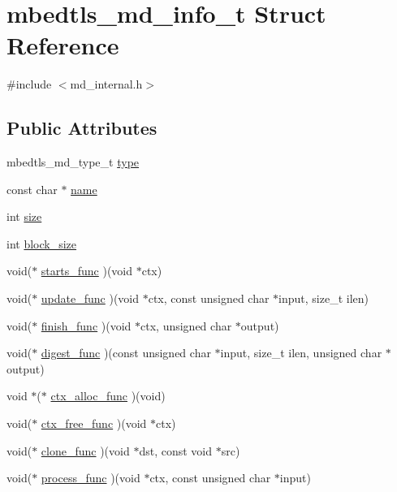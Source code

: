 \hypertarget{structmbedtls__md__info__t}{\section{mbedtls\-\_\-md\-\_\-info\-\_\-t Struct Reference}
\label{structmbedtls__md__info__t}
}


{\ttfamily \#include $<$md\-\_\-internal.\-h$>$}

\subsection*{Public Attributes}
\begin{DoxyCompactItemize}
\item 
mbedtls\-\_\-md\-\_\-type\-\_\-t \hyperlink{structmbedtls__md__info__t_ae27d588a1b1a7c4f96384fc5705f5c3d}{type}
\item 
const char $\ast$ \hyperlink{structmbedtls__md__info__t_a91340331832845c885d99884426d21c6}{name}
\item 
int \hyperlink{structmbedtls__md__info__t_a17a6641cfc5d4e7542d450463c4122f6}{size}
\item 
int \hyperlink{structmbedtls__md__info__t_a2090181c3aef5c7d692147340a6bdf99}{block\-\_\-size}
\item 
void($\ast$ \hyperlink{structmbedtls__md__info__t_a69899182d91a8dbc034bfcf8b87517e6}{starts\-\_\-func} )(void $\ast$ctx)
\item 
void($\ast$ \hyperlink{structmbedtls__md__info__t_a7bb49e033b3b8a1def01f393f40bbef1}{update\-\_\-func} )(void $\ast$ctx, const unsigned char $\ast$input, size\-\_\-t ilen)
\item 
void($\ast$ \hyperlink{structmbedtls__md__info__t_aa4318bc22c60d0e37dc976ac9ad2f704}{finish\-\_\-func} )(void $\ast$ctx, unsigned char $\ast$output)
\item 
void($\ast$ \hyperlink{structmbedtls__md__info__t_a1f6293aafcd824caef39ed3daf75f0b4}{digest\-\_\-func} )(const unsigned char $\ast$input, size\-\_\-t ilen, unsigned char $\ast$output)
\item 
void $\ast$($\ast$ \hyperlink{structmbedtls__md__info__t_a751f793f0b843972d8a979544785bb61}{ctx\-\_\-alloc\-\_\-func} )(void)
\item 
void($\ast$ \hyperlink{structmbedtls__md__info__t_a208baa42f9678bd4668636ae96c3e151}{ctx\-\_\-free\-\_\-func} )(void $\ast$ctx)
\item 
void($\ast$ \hyperlink{structmbedtls__md__info__t_ae5ad4251218debad0702d67d4dd176f9}{clone\-\_\-func} )(void $\ast$dst, const void $\ast$src)
\item 
void($\ast$ \hyperlink{structmbedtls__md__info__t_af583a5095ca99579f441d2ba0e1accb8}{process\-\_\-func} )(void $\ast$ctx, const unsigned char $\ast$input)
\end{DoxyCompactItemize}


